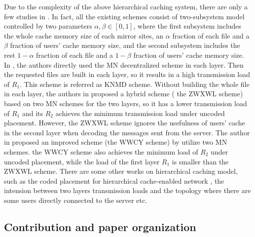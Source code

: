 \documentclass[onecolumn,10pt]{IEEEtran}
\theoremstyle{mythm}
\begin{document}
Due to the complexity of the above hierarchical caching system, there are only a few studies in \cite{KNMD,ZWXWL,WWCY}.
In fact, all the existing schemes consist of two-subsystem model controlled by two parameters $\alpha,\beta\in[0,1]$, where the first subsystem includes the whole cache memory size of each mirror sites, an $\alpha$ fraction of each file and a $\beta$ fraction of users' cache memory size, and the second subsystem includes the rest $1-\alpha$ fraction of each file and a $1-\beta$ fraction of users' cache memory size. In \cite{KNMD}, the authors directly used the MN decentralized scheme in each layer. Then the requested files are built in each layer, so it results in a high transmission load of $R_1$. This scheme is referred as KNMD scheme. Without building the whole file in each layer, the authors in \cite{ZWXWL} proposed a hybrid scheme ( the ZWXWL scheme) based on two MN schemes for the two layers, so it has a lower transmission load of $R_1$ and its $R_2$ achieves the minimum transmission load under uncoded placement. However, the ZWXWL scheme ignores the usefulness of users' cache in the second layer when decoding the messages sent from the server. The author in \cite{WWCY} proposed an improved scheme (the WWCY scheme) by utilize two MN schemes. the WWCY scheme also achieves the minimum load of $R_2$ under uncoded placement, while the load of the first layer $R_1$ is smaller than the ZWXWL scheme. There are some other works on hierarchical caching model, such as the coded placement for hierarchical cache-enabled network \cite{TWGSZQX,TWGSSZQX}, the intension between two layers transmission loads \cite{LZX} and the topology where there are some users directly connected to the server \cite{TMHMMM} etc.







\subsection{Contribution and paper organization}
\label{subsec:con-org}
\end{document}
